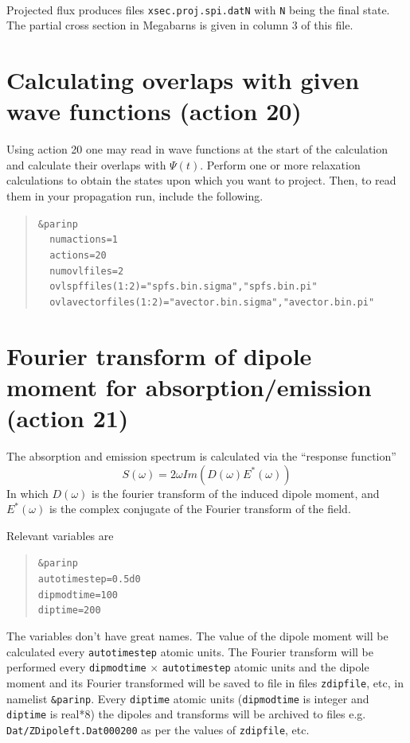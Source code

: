 \documentclass[10pt,leqno, oneside]{book}
\begin{document}
\

Projected flux produces files \verb#xsec.proj.spi.datN# with \verb#N# being the final state.  The partial cross section in Megabarns is given in column 3 of this file.

\section{Calculating overlaps with given wave functions (action 20)}

Using action 20 one may read in wave functions at the start of the calculation and calculate their overlaps with $\Psi(t)$.
%
Perform one or more relaxation calculations to obtain the states upon which you want to project.  Then, to read them in your
propagation run, include the following.

\begin{quote}
{\footnotesize
\verb#&parinp# \\
\verb#  numactions=1#\\
\verb#  actions=20# \\
\verb#  numovlfiles=2# \\
\verb#  ovlspffiles(1:2)="spfs.bin.sigma","spfs.bin.pi"# \\
\verb#  ovlavectorfiles(1:2)="avector.bin.sigma","avector.bin.pi"# \\
}\end{quote}


\section{Fourier transform of dipole moment for absorption/emission (action 21)}

The absorption and emission spectrum is calculated via the ``response function''
\begin{equation}
S(\omega) = 2 \omega Im (D(\omega) E^*(\omega))
\end{equation}
In which $D(\omega)$ is the fourier transform of the induced dipole moment, and $E^*(\omega)$ is the complex conjugate of
the Fourier transform of the field.

Relevant variables are
\begin{quote}
{\footnotesize
\verb#&parinp# \\
\verb#autotimestep=0.5d0# \\
\verb#dipmodtime=100# \\
\verb#diptime=200# \\
}
\end{quote}
The variables don't have great names.  The value of the dipole moment will be calculated every \verb#autotimestep# atomic
units.  The Fourier transform will be performed every \verb#dipmodtime# $\times$ \verb#autotimestep# atomic units and the
dipole moment and its Fourier transformed will be saved to file in files \verb#zdipfile#, etc, in namelist \verb#&parinp#.
Every \verb#diptime# atomic units (\verb#dipmodtime# is integer and \verb#diptime# is real*8) the dipoles and transforms will
be archived to files e.g. \verb#Dat/ZDipoleft.Dat000200# as per the values of \verb#zdipfile#, etc.
\end{document}
